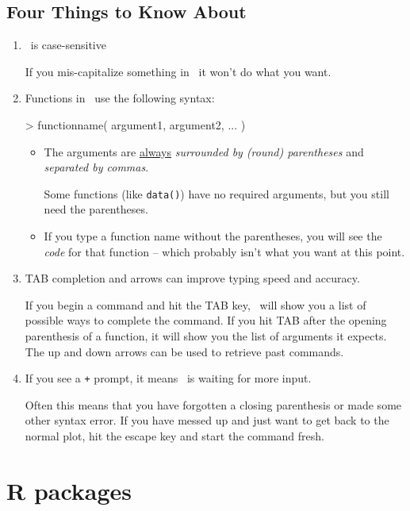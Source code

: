 \subsection*{Four Things to Know About \R}
\begin{enumerate}
\Rwidth=6.25in
\item \R\ is case-sensitive

If you mis-capitalize something in \R\ it won't do what you want.

\item 
Functions in \R\ use the following syntax:

\begin{Schunk}
\begin{Sinput}
> functionname( argument1, argument2, ... )
\end{Sinput}
\end{Schunk}
\vspace{-5mm}
\begin{itemize}
\item The arguments are \underline{always} \emph{surrounded by (round) parentheses} and 
\emph{separated by commas}.

Some functions (like \verb!data()!) 
have no required arguments, but you still need the parentheses.

\item
If you type a function name without the parentheses, you will see the \emph{code} for that
function -- which probably isn't what you want at this point.
\end{itemize}
\item
TAB completion and arrows can improve typing speed and accuracy.

If you begin a command and hit the TAB key, \R\ will show you a list of possible ways to 
complete the command.  If you hit TAB after the opening parenthesis of a function, it will show you
the list of arguments it expects.  The up and down arrows can be used to retrieve past commands.
\item
If you see a \verb!+! prompt, it means \R\ is waiting for more input.

Often this means that you have forgotten a closing parenthesis or made some other
syntax error.  If you have messed up and just want to get back to the normal plot,
hit the escape key and start the command fresh.
\end{enumerate}

\section{R packages}

